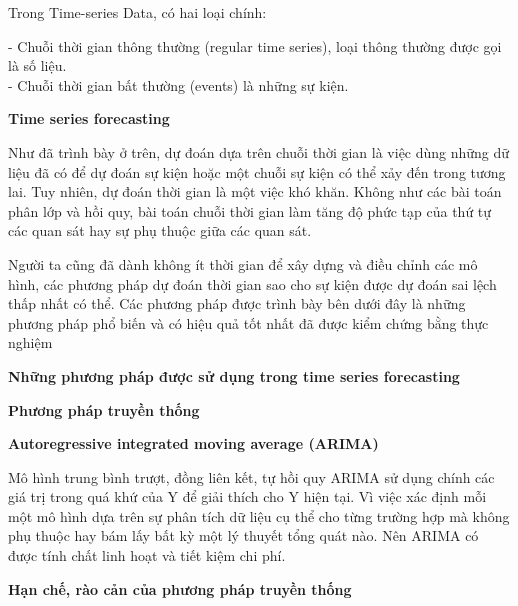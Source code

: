 \bigskip
Trong Time-series Data, có hai loại chính:

- Chuỗi thời gian thông thường (regular time series), loại thông thường được gọi là số liệu.\\
- Chuỗi thời gian bất thường (events) là những sự kiện.



\vspace{1cm}
\changefontsizes{15pt}
\setlength{\parindent}{0cm}
\textbf{Time series forecasting}

\vspace{1cm}
\changefontsizes{13pt}

Như đã trình bày ở trên, dự đoán dựa trên chuỗi thời gian là việc dùng những dữ liệu đã có để dự đoán sự kiện hoặc một chuỗi sự kiện có thể xảy đến trong tương lai. Tuy nhiên, dự đoán thời gian là một việc khó khăn. Không như các bài toán phân lớp và hồi quy, bài toán chuỗi thời gian làm tăng độ phức tạp của thứ tự các quan sát hay sự phụ thuộc giữa các quan sát. 

\bigskip
Người ta cũng đã dành không ít thời gian để xây dựng và điều chỉnh các mô hình, các phương pháp dự đoán thời gian sao cho sự kiện được dự đoán sai lệch thấp nhất có thể. Các phương pháp được trình bày bên dưới đây là những phương pháp phổ biến và có hiệu quả tốt nhất đã được kiểm chứng bằng thực nghiệm


\vspace{1cm}
\changefontsizes{15pt}
\setlength{\parindent}{0cm}
\textbf{Những phương pháp được sử dụng trong time series forecasting}

\bigskip
\changefontsizes{14pt}
\setlength{\parindent}{0cm}
\textbf{Phương pháp truyền thống}

\bigskip
\changefontsizes{13pt}
\setlength{\parindent}{0cm}
\textbf{Autoregressive integrated moving average (ARIMA)}

\smallskip
Mô hình trung bình trượt, đồng liên kết, tự hồi quy ARIMA sử dụng chính các giá trị trong quá khứ của Y để giải thích cho Y hiện tại. Vì việc xác định mỗi một mô hình dựa trên sự phân tích dữ liệu cụ thể cho từng trường hợp mà không phụ thuộc hay bám lấy bất kỳ một lý thuyết tổng quát nào. Nên ARIMA có được tính chất linh hoạt và tiết kiệm chi phí.

\vspace{0.7cm}
\changefontsizes{13pt}
\setlength{\parindent}{0cm}
\textbf{Hạn chế, rào cản của phương pháp truyền thống}

